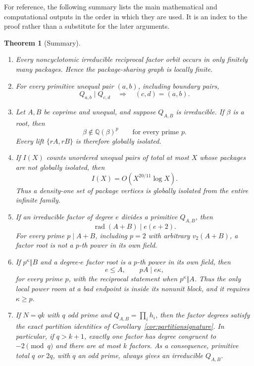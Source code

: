 \documentclass[11pt]{article}
\newtheorem{theorem}{Theorem}[section]
\theoremstyle{definition}
\newcommand{\Q}{\mathbb Q}
\begin{document}
For reference, the following summary lists the main mathematical and
computational outputs in the order in which they are used.  It is an index to
the proof rather than a substitute for the later arguments.

\begin{theorem}[Summary]\label{thm:summary}
\leavevmode
\begin{enumerate}[label=(\roman*)]
\item Every noncyclotomic irreducible reciprocal factor orbit occurs in only
finitely many packages.  Hence the package-sharing graph is locally finite.

\item For every primitive unequal pair \((a,b)\), including boundary pairs,
\[
 Q_{a,b}\mid Q_{c,d}\quad\Longrightarrow\quad(c,d)=(a,b).
\]

\item Let \(A,B\) be coprime and unequal, and suppose \(Q_{A,B}\) is
irreducible.  If \(\beta\) is a root, then
\[
 \beta\notin\Q(\beta)^p
 \qquad\text{for every prime }p.
\]
Every lift \(\{rA,rB\}\) is therefore globally isolated.

\item If \(I(X)\) counts unordered unequal pairs of total at most \(X\)
whose packages are not globally isolated, then
\[
 I(X)=O\!\left(X^{20/11}\log X\right).
\]
Thus a density-one set of package vertices is globally isolated from the
entire infinite family.

\item If an irreducible factor of degree \(e\) divides a primitive
\(Q_{A,B}\), then
\[
 \operatorname{rad}(A+B)\mid e(e+2).
\]
For every prime \(p\mid A+B\), including \(p=2\) with arbitrary
\(v_2(A+B)\), a factor root is not a \(p\)-th power in its own field.

\item If \(p^\kappa\Vert B\) and a degree-\(e\) factor root is a
\(p\)-th power in its own field, then
\[
 e\leq A,\qquad pA\mid e\kappa,
\]
for every prime \(p\), with the reciprocal statement when
\(p^\kappa\Vert A\).  Thus the only local power room at a bad endpoint is
inside its nonunit block, and it requires \(\kappa\geq p\).

\item If \(N=qk\) with \(q\) odd prime and
\(Q_{A,B}=\prod_i h_i\), then the factor degrees satisfy the exact
partition identities of Corollary~\ref{cor:partitionsignature}.  In
particular, if \(q>k+1\), exactly one factor has degree congruent to
\(-2\pmod q\) and there are at most \(k\) factors.  As a consequence,
primitive total \(q\) or \(2q\), with \(q\) an odd prime, always gives
an irreducible \(Q_{A,B}\).


\end{enumerate}
\end{theorem}
\end{document}
